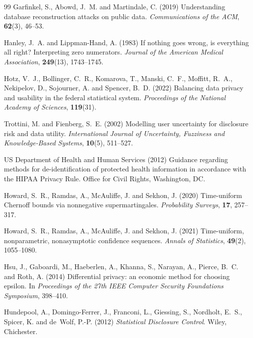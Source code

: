 \documentclass[11pt,a4paper]{article}
\theoremstyle{plain}
\theoremstyle{definition}
\begin{document}
\begin{thebibliography}{99}
Garfinkel, S., Abowd, J.~M. and Martindale, C. (2019) Understanding database
reconstruction attacks on public data. \emph{Communications of the ACM},
\textbf{62}(3), 46--53.

Hanley, J.~A. and Lippman-Hand, A. (1983) If nothing goes wrong, is everything
all right? Interpreting zero numerators. \emph{Journal of the American Medical
Association}, \textbf{249}(13), 1743--1745.

Hotz, V.~J., Bollinger, C.~R., Komarova, T., Manski, C.~F., Moffitt, R.~A.,
Nekipelov, D., Sojourner, A. and Spencer, B.~D. (2022) Balancing data privacy
and usability in the federal statistical system. \emph{Proceedings of the
National Academy of Sciences}, \textbf{119}(31).

Trottini, M. and Fienberg, S.~E. (2002) Modelling user uncertainty for
disclosure risk and data utility. \emph{International Journal of Uncertainty,
Fuzziness and Knowledge-Based Systems}, \textbf{10}(5), 511--527.

US Department of Health and Human Services (2012) Guidance regarding methods for
de-identification of protected health information in accordance with the HIPAA
Privacy Rule. Office for Civil Rights, Washington, DC.

Howard, S.~R., Ramdas, A., McAuliffe, J. and Sekhon, J. (2020) Time-uniform
Chernoff bounds via nonnegative supermartingales. \emph{Probability Surveys},
\textbf{17}, 257--317.

Howard, S.~R., Ramdas, A., McAuliffe, J. and Sekhon, J. (2021) Time-uniform,
nonparametric, nonasymptotic confidence sequences. \emph{Annals of Statistics},
\textbf{49}(2), 1055--1080.

Hsu, J., Gaboardi, M., Haeberlen, A., Khanna, S., Narayan, A., Pierce, B.~C. and
Roth, A. (2014) Differential privacy: an economic method for choosing epsilon.
In \emph{Proceedings of the 27th IEEE Computer Security Foundations Symposium},
398--410.

Hundepool, A., Domingo-Ferrer, J., Franconi, L., Giessing, S., Nordholt, E.~S.,
Spicer, K. and de~Wolf, P.-P. (2012) \emph{Statistical Disclosure Control}.
Wiley, Chichester.


\end{thebibliography}
\end{document}
